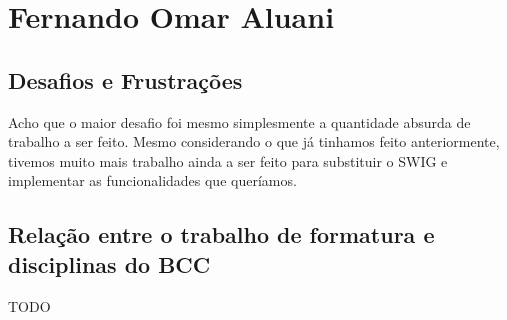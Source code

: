 \chapter{Fernando Omar Aluani}
\label{sec:omar_subjetiva}

\section{Desafios e Frustrações}
\label{sec:omar:desafios_frustracoes}

Acho que o maior desafio foi mesmo simplesmente a quantidade absurda de trabalho a
ser feito. Mesmo considerando o que já tinhamos feito anteriormente, tivemos muito
mais trabalho ainda a ser feito para substituir o SWIG e implementar as funcionalidades
que queríamos.

\section{Relação entre o trabalho de formatura e disciplinas do BCC}
\label{sec:omar:relacao_disciplinas_bcc}

TODO

